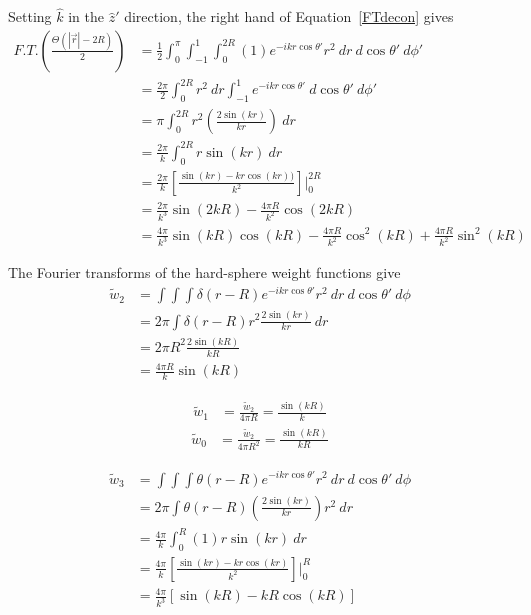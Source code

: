 \documentclass[double,12pt]{beavtex}
\begin{document}
Setting $\hat k$ in the $\hat z'$ direction, the right hand of Equation~\ref{FTdecon} gives
\begin{align} \label{leftside} 
    F.T.\left(\frac{\Theta(|\vec{r}|-2R)}{2}\right) 
       &=\frac{1}{2}\int_0^\pi \int_{-1}^1\int_0^{2R}(1)e^{-ikr\cos \theta'}r^2~dr~d\cos \theta'~d\phi'  \nonumber  \\
       &=\frac{2\pi}{2}\int_0^{2R} r^2~dr\int_{-1}^1 e^{-ikr\cos \theta'}~d\cos \theta'~d\phi' \nonumber   \\
       &=\pi\int_0^{2R} r^2\left(\frac{2\sin (kr)}{kr}\right)~dr \nonumber  \\
       &=\frac{2\pi}{k}\int_0^{2R} r\sin (kr)~dr \nonumber  \\
       &=\frac{2\pi}{k}\left[\frac{\sin (kr)-kr\cos (kr))}{k^2}\right] \bigg|_0^{2R} \nonumber  \\
       &= \frac{2\pi}{k^3}\sin (2kR)-\frac{4\pi R}{k^2}\cos (2kR) \nonumber  \\
       &= \frac{4\pi}{k^3}\sin (kR)\cos (kR) - \frac{4 \pi R}{k^2}\cos^2 (kR) + \frac{4\pi R}{k^2} \sin^2 (kR)
\end{align}

The Fourier transforms of the hard-sphere weight functions give
\begin{align}
    \widetilde{w}_2 &= \int\int\int\delta(r-R)e^{-ikr\cos \theta'} r^2~dr~d\cos \theta'~d\phi  \nonumber  \\
                    &= 2\pi\int\delta(r-R)r^2 \frac{2\sin (kr)}{kr}~dr \nonumber  \\
                    &= 2\pi R^2 \frac{2\sin (kR)}{kR} \nonumber  \\
                    &= \frac{4\pi R}{k} \sin (kR)
\end{align}

\begin{align}
    \widetilde{w}_1 &= \frac{\widetilde{w}_2}{4\pi R}= \frac{\sin (kR)}{k} 
\end{align}
\begin{align}
    \widetilde{w}_0 &= \frac{\widetilde{w}_2}{4\pi R^2}= \frac{\sin (kR)}{kR}
\end{align}

\begin{align}
    \widetilde{w}_3 &= \int\int\int\theta(r-R)e^{-ikr\cos \theta'}r^2~dr~d\cos\theta'~d\phi  \nonumber \\
                    &= 2\pi\int\theta(r-R)\left(\frac{2\sin (kr)}{kr}\right)r^2~dr  \nonumber  \\
                    &= \frac{4\pi}{k}\int_0^R (1)r\sin (kr)~dr  \nonumber  \\
                    &= \frac{4\pi}{k}\left[\frac{\sin (kr) - kr\cos (kr)}{k^2}\right]\bigg|_0^R  \nonumber  \\
                    &= \frac{4\pi}{k^3}\left[\sin (kR) - kR\cos (kR)\right]
\end{align}
\end{document}
